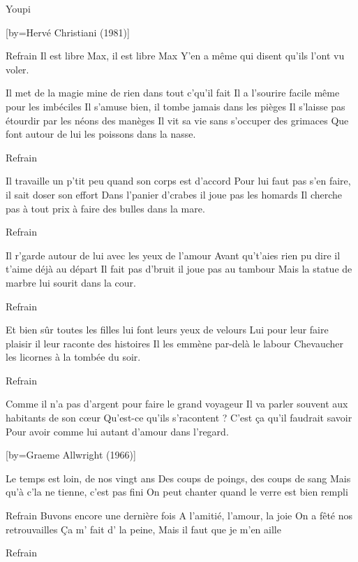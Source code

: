 \beginverse
Youpi\!
\endverse

[by={Hervé Christiani (1981)}]

\beginverse
Refrain
Il est libre Max, il est libre Max
Y'en a même qui disent qu'ils l'ont vu voler.
\endverse

\beginverse
Il met de la magie mine de rien dans tout c'qu'il fait
Il a l'sourire facile même pour les imbéciles
Il s'amuse bien, il tombe jamais dans les pièges
Il s'laisse pas étourdir par les néons des manèges
Il vit sa vie sans s'occuper des grimaces
Que font autour de lui les poissons dans la nasse.
\endverse

\beginverse
Refrain
\endverse

\beginverse
Il travaille un p'tit peu quand son corps est d'accord
Pour lui faut pas s'en faire, il sait doser son effort
Dans l'panier d'crabes il joue pas les homards
Il cherche pas à tout prix à faire des bulles dans la mare.
\endverse

\beginverse
Refrain
\endverse

\beginverse
Il r'garde autour de lui avec les yeux de l'amour
Avant qu't'aies rien pu dire il t'aime déjà au départ
Il fait pas d'bruit il joue pas au tambour
Mais la statue de marbre lui sourit dans la cour.
\endverse

\beginverse
Refrain
\endverse

\beginverse
Et bien sûr toutes les filles lui font leurs yeux de velours
Lui pour leur faire plaisir il leur raconte des histoires
Il les emmène par-delà le labour
Chevaucher les licornes à la tombée du soir.
\endverse

\beginverse
Refrain
\endverse

\beginverse
Comme il n'a pas d'argent pour faire le grand voyageur
Il va parler souvent aux habitants de son cœur
Qu'est-ce qu'ils s'racontent ? C'est ça qu'il faudrait savoir
Pour avoir comme lui autant d'amour dans l'regard.
\endverse

[by={Graeme Allwright (1966)}]

\beginverse
Le temps est loin, de nos vingt ans
Des coups de poings, des coups de sang
Mais qu'à c'la ne tienne, c'est pas fini
On peut chanter quand le verre est bien rempli
\endverse

\beginverse
Refrain
Buvons encore une dernière fois
A l'amitié, l'amour, la joie
On a fêté nos retrouvailles
Ça m' fait d' la peine,
Mais il faut que je m'en aille
\endverse

\beginverse
Refrain
\endverse

